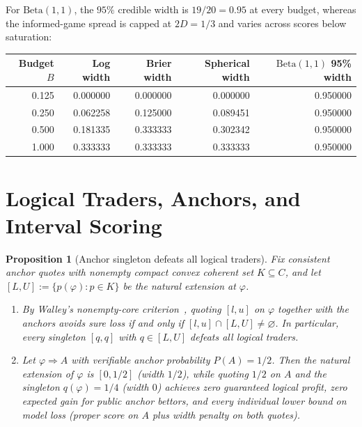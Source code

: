\documentclass[11pt]{article}
\theoremstyle{plain}
\newtheorem{proposition}[theorem]{Proposition}
\theoremstyle{definition}
\theoremstyle{remark}
\begin{document}
For $\mathrm{Beta}(1, 1)$, the $95\%$ credible width is $19/20 = 0.95$ at every budget, whereas the informed-game spread is capped at $2D = 1/3$ and varies across scores below saturation:

\begin{table}[h]\centering\small
\begin{tabular}{rrrrr}
\toprule
Budget $B$ & Log width & Brier width & Spherical width & $\mathrm{Beta}(1,1)$ 95\% width \\
\midrule
0.125 & 0.000000 & 0.000000 & 0.000000 & 0.950000 \\
0.250 & 0.062258 & 0.125000 & 0.089451 & 0.950000 \\
0.500 & 0.181335 & 0.333333 & 0.302342 & 0.950000 \\
1.000 & 0.333333 & 0.333333 & 0.333333 & 0.950000 \\
\bottomrule
\end{tabular}
\end{table}

\section{Logical Traders, Anchors, and Interval Scoring}\label{sec:logic}

\begin{proposition}[Anchor singleton defeats all logical traders]\label{prop:anchor}
Fix consistent anchor quotes with nonempty compact convex coherent set $K \subseteq C$, and let $[L, U] := \{p(\varphi) : p \in K\}$ be the natural extension at $\varphi$.
\begin{enumerate}[label=\textup{(\arabic*)}]
\item By Walley's nonempty-core criterion~\cite{walley1991}, quoting $[l, u]$ on $\varphi$ together with the anchors avoids sure loss if and only if $[l, u] \cap [L, U] \neq \varnothing$. In particular, every singleton $[q, q]$ with $q \in [L, U]$ defeats all logical traders.
\item Let $\varphi \Rightarrow A$ with verifiable anchor probability $P(A) = 1/2$. Then the natural extension of $\varphi$ is $[0, 1/2]$ (width $1/2$), while quoting $1/2$ on $A$ and the singleton $q(\varphi) = 1/4$ (width $0$) achieves zero guaranteed logical profit, zero expected gain for public anchor bettors, and every individual lower bound on model loss (proper score on $A$ plus width penalty on both quotes).
\end{enumerate}
\end{proposition}
\end{document}
